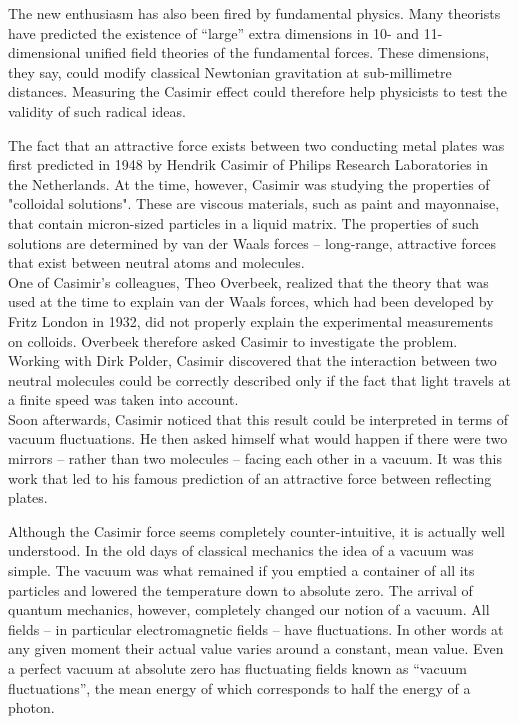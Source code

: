 	The new enthusiasm has also been fired by fundamental physics. Many theorists have predicted the existence of “large” extra dimensions in 10- and 11-dimensional unified field theories of the fundamental forces. These dimensions, they say, could modify classical Newtonian gravitation at sub-millimetre distances. Measuring the Casimir effect could therefore help physicists to test the validity of such radical ideas.
	
	\begin{tcolorbox}[title=Remark,colframe=black,arc=10pt]
	The fact that an attractive force exists between two conducting metal plates was first predicted in 1948 by Hendrik Casimir of Philips Research Laboratories in the Netherlands. At the time, however, Casimir was studying the properties of "colloidal solutions". These are viscous materials, such as paint and mayonnaise, that contain micron-sized particles in a liquid matrix. The properties of such solutions are determined by van der Waals forces – long-range, attractive forces that exist between neutral atoms and molecules.\\

	One of Casimir’s colleagues, Theo Overbeek, realized that the theory that was used at the time to explain van der Waals forces, which had been developed by Fritz London in 1932, did not properly explain the experimental measurements on colloids. Overbeek therefore asked Casimir to investigate the problem. Working with Dirk Polder, Casimir discovered that the interaction between two neutral molecules could be correctly described only if the fact that light travels at a finite speed was taken into account.\\

	Soon afterwards, Casimir noticed that this result could be interpreted in terms of vacuum fluctuations. He then asked himself what would happen if there were two mirrors – rather than two molecules – facing each other in a vacuum. It was this work that led to his famous prediction of an attractive force between reflecting plates.
	\end{tcolorbox}
	
	Although the Casimir force seems completely counter-intuitive, it is actually well understood. In the old days of classical mechanics the idea of a vacuum was simple. The vacuum was what remained if you emptied a container of all its particles and lowered the temperature down to absolute zero. The arrival of quantum mechanics, however, completely changed our notion of a vacuum. All fields – in particular electromagnetic fields – have fluctuations. In other words at any given moment their actual value varies around a constant, mean value. Even a perfect vacuum at absolute zero has fluctuating fields known as “vacuum fluctuations”, the mean energy of which corresponds to half the energy of a photon.

